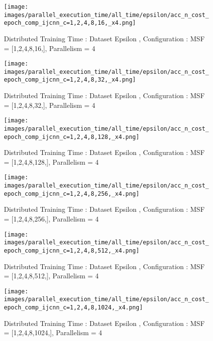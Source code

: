 \begin{figure*}[htbp]
\centering
\texttt{[image: images/parallel\_execution\_time/all\_time/epsilon/acc\_n\_cost\_epoch\_comp\_ijcnn\_c=1,2,4,8,16,\_x4.png]}
\caption{Distributed Training Time : Dataset Epsilon , Configuration : MSF = [1,2,4,8,16,], Parallelism = 4}
\label{fig:dis-msf-tr-time-epsilon-x4}
\end{figure*}


\begin{figure*}[htbp]
\centering
\texttt{[image: images/parallel\_execution\_time/all\_time/epsilon/acc\_n\_cost\_epoch\_comp\_ijcnn\_c=1,2,4,8,32,\_x4.png]}
\caption{Distributed Training Time : Dataset Epsilon , Configuration : MSF = [1,2,4,8,32,], Parallelism = 4}
\label{fig:dis-msf-tr-time-epsilon-x4}
\end{figure*}


\begin{figure*}[htbp]
\centering
\texttt{[image: images/parallel\_execution\_time/all\_time/epsilon/acc\_n\_cost\_epoch\_comp\_ijcnn\_c=1,2,4,8,128,\_x4.png]}
\caption{Distributed Training Time : Dataset Epsilon , Configuration : MSF = [1,2,4,8,128,], Parallelism = 4}
\label{fig:dis-msf-tr-time-epsilon-x4}
\end{figure*}


\begin{figure*}[htbp]
\centering
\texttt{[image: images/parallel\_execution\_time/all\_time/epsilon/acc\_n\_cost\_epoch\_comp\_ijcnn\_c=1,2,4,8,256,\_x4.png]}
\caption{Distributed Training Time : Dataset Epsilon , Configuration : MSF = [1,2,4,8,256,], Parallelism = 4}
\label{fig:dis-msf-tr-time-epsilon-x4}
\end{figure*}


\begin{figure*}[htbp]
\centering
\texttt{[image: images/parallel\_execution\_time/all\_time/epsilon/acc\_n\_cost\_epoch\_comp\_ijcnn\_c=1,2,4,8,512,\_x4.png]}
\caption{Distributed Training Time : Dataset Epsilon , Configuration : MSF = [1,2,4,8,512,], Parallelism = 4}
\label{fig:dis-msf-tr-time-epsilon-x4}
\end{figure*}


\begin{figure*}[htbp]
\centering
\texttt{[image: images/parallel\_execution\_time/all\_time/epsilon/acc\_n\_cost\_epoch\_comp\_ijcnn\_c=1,2,4,8,1024,\_x4.png]}
\caption{Distributed Training Time : Dataset Epsilon , Configuration : MSF = [1,2,4,8,1024,], Parallelism = 4}
\label{fig:dis-msf-tr-time-epsilon-x4}
\end{figure*}


